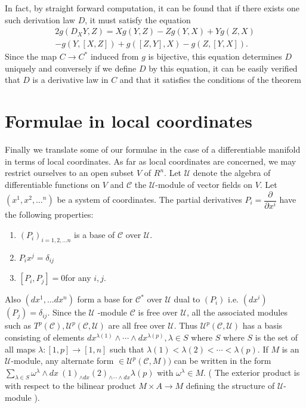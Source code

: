 In fact, by straight forward computation, it can be found that if
there exists one such derivation law $D$, it must satisfy the
equation 
\begin{multline*}
  2 g ( D_X Y,Z ) = Xg ( Y,Z ) -Z g ( Y,X ) + Yg ( Z,X )\\ 
  -g  ( Y,[ X,Z ]) + g ( [ Z,Y ], X )  -g ( Z,[ Y,X ] ).  
\end{multline*}
Since the map $ C \to C^* $ induced from $g$ is bijective, this
equation determines $D$ uniquely and conversely if we define $D$ by
this equation, it can be easily verified that $D$ is a derivative law
in  $C$ and that it satisfies the conditions of the theorem  

\section{Formulae in local coordinates}\label{chap1:sec13}%

Finally we translate some of our formulae in the case of a
differentiable manifold in terms  of local coordinates. As far as local
coordinates are concerned, we may restrict ourselves to an open subset
$V$ of $R^n$. Let $ \mathscr{U} $ denote the algebra of differentiable
functions on  $V$ and $ \mathscr{C} $ the $ \mathscr{U} $-module of
vector fields on $V$. Let $ ( x^1,x^2, \ldots^n ) $ be a system of
coordinates. The partial derivatives $ P_i = \dfrac{\partial}{\partial
  x^i} $ have the following properties: 

\begin{enumerate}[1)]
\item $(P_i)_{i=1,2,\ldots n} $ is a base of $ \mathscr{C} $ over $
  \mathscr{U} $.  
\item $ P_i x^j = \delta_{ij} $
\item $[ P_i , P_j] = 0$\pageoriginale for any $ i,j $.
\end{enumerate}

Also $(dx^1, \ldots dx^n)$ form a base for $ \mathscr{C}^* $ over
$ \mathscr{U} $  dual to  $ ( P_i ) $ i.e. $ ( dx^i )$ $(P_j ) =
\delta_{ij} $. Since the $ \mathscr{U} $ -module $ \mathscr{C} $ is
free over $ \mathscr{U} $, all the associated modules such as  $ T^p (
\mathscr{C} ), \mathscr{U} ^p ( \mathscr{C}, \mathscr{U} ) $ are all
free over $ \mathscr{U} $.  Thus $ \mathscr{U}^p ( \mathscr{C},
\mathscr{U})$ has a basis consisting of elements $ dx^{\lambda (1)}
\wedge \cdots \wedge  dx^{\lambda (p) }, \lambda \in S $ where $S$
where $S$ is the set of all maps  $ \lambda :[ 1,p ] \to [ 1,n ] $
such that  $ \lambda (1) < \lambda (2)  < \cdots < \lambda (p) $. If
$M$ is an $ \mathscr{U} $-module, any alternate form $ \in
\mathscr{U}^p ( \mathscr{C},M ) ) $ can be written  in the form $ \sum
\limits_{\lambda \in S} \omega^\lambda \wedge dx  ~ {(1)}_{\wedge dx}
{(2)}_{\wedge \cdots \wedge dx}  \lambda (p) $ with $ \omega^\lambda
\in M $. ( The exterior product is with respect to  the bilinear
product  $ M \times A  \to  M $ defining the structure of $
\mathscr{U} $-module ). 

